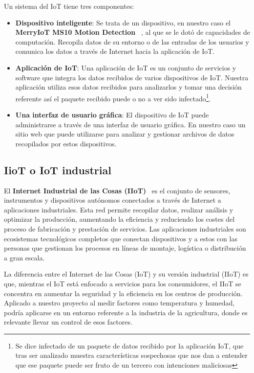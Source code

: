 Un sistema del IoT tiene tres componentes:
\begin{itemize}
   \item \textbf{Dispositivo inteligente}: Se trata de un dispositivo, en nuestro caso el \textbf{MerryIoT MS10 Motion Detection}~\cite{MerryIoT:manual} , al que se le dotó de capacidades de computación. Recopila datos de su entorno o de las entradas de los usuarios y comunica los datos a través de Internet hacia la aplicación de IoT.
    \item \textbf{Aplicación de IoT}: Una aplicación de IoT es un conjunto de servicios y software que integra los datos recibidos de varios dispositivos de IoT. Nuestra aplicación utiliza esos datos recibidos para analizarlos y tomar una decisión referente así el paquete recibido puede o no a ver sido infectado\footnote{Se dice infectado de un paquete de datos recibido por la aplicación IoT, que tras ser analizado muestra características sospechosas que nos dan a entender que ese paquete puede ser fruto de un tercero con intenciones maliciosas}.
    \item \textbf{Una interfaz de usuario gráfica}: El dispositivo de IoT puede administrarse a través de una interfaz de usuario gráfica. En nuestro caso un sitio web que puede utilizarse para analizar y gestionar archivos de datos recopilados por estos dispositivos.
\end{itemize}



\subsection{IioT o IoT industrial}
El \textbf{Internet Industrial de las Cosas (IIoT)}~\cite{ib:iiot} es el conjunto de sensores, instrumentos y dispositivos autónomos conectados a través de Internet a aplicaciones industriales. Esta red permite recopilar datos, realizar análisis y optimizar la producción, aumentando la eficiencia y reduciendo los costes del proceso de fabricación y prestación de servicios. Las aplicaciones industriales son ecosistemas tecnológicos completos que conectan dispositivos y a estos con las personas que gestionan los procesos en líneas de montaje, logística o distribución a gran escala.

La diferencia entre el Internet de las Cosas (IoT) y su versión industrial (IIoT) es que, mientras el IoT está enfocado a servicios para los consumidores, el IIoT se concentra en aumentar la seguridad y la eficiencia en los centros de producción. Aplicado a nuestro proyecto al medir factores como temperatura y humedad, podría aplicarse en un entorno referente a la industria de la agricultura, donde es relevante llevar un control de esos factores.



